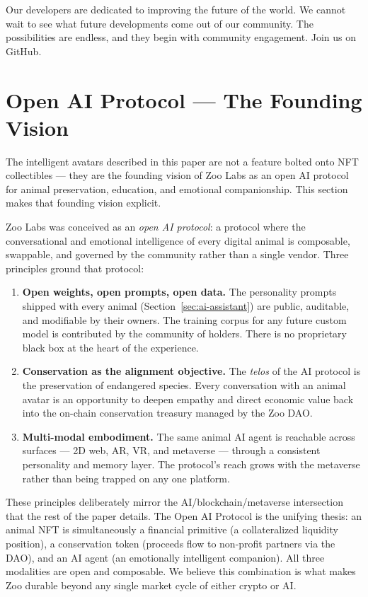 Our developers are dedicated to improving the future of the world. We cannot wait to see what future developments come out of our community. The possibilities are endless, and they begin with community engagement. Join us on GitHub.

\section{Open AI Protocol --- The Founding Vision}
\label{sec:open-ai-protocol}

The intelligent avatars described in this paper are not a feature bolted onto NFT collectibles --- they are the founding vision of Zoo Labs as an open AI protocol for animal preservation, education, and emotional companionship. This section makes that founding vision explicit.

Zoo Labs was conceived as an \emph{open AI protocol}: a protocol where the conversational and emotional intelligence of every digital animal is composable, swappable, and governed by the community rather than a single vendor. Three principles ground that protocol:

\begin{enumerate}
  \item \textbf{Open weights, open prompts, open data.} The personality prompts shipped with every animal (Section~\ref{sec:ai-assistant}) are public, auditable, and modifiable by their owners. The training corpus for any future custom model is contributed by the community of holders. There is no proprietary black box at the heart of the experience.
  \item \textbf{Conservation as the alignment objective.} The \emph{telos} of the AI protocol is the preservation of endangered species. Every conversation with an animal avatar is an opportunity to deepen empathy and direct economic value back into the on-chain conservation treasury managed by the Zoo DAO.
  \item \textbf{Multi-modal embodiment.} The same animal AI agent is reachable across surfaces --- 2D web, AR, VR, and metaverse --- through a consistent personality and memory layer. The protocol's reach grows with the metaverse rather than being trapped on any one platform.
\end{enumerate}

These principles deliberately mirror the AI/blockchain/metaverse intersection that the rest of the paper details. The Open AI Protocol is the unifying thesis: an animal NFT is simultaneously a financial primitive (a collateralized liquidity position), a conservation token (proceeds flow to non-profit partners via the DAO), and an AI agent (an emotionally intelligent companion). All three modalities are open and composable. We believe this combination is what makes Zoo durable beyond any single market cycle of either crypto or AI.

